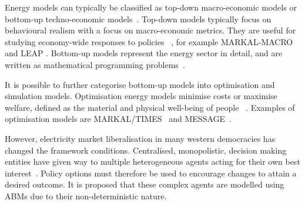 
Energy models can typically be classified as top-down macro-economic models or bottom-up techno-economic models~\cite{Bohringer1998}. Top-down models typically focus on behavioural realism with a focus on macro-economic metrics. They are useful for studying economy-wide responses to policies ~\cite{Hall2016}, for example MARKAL-MACRO \cite{Fishbone1981} and LEAP \cite{Heaps2016}. Bottom-up models represent the energy sector in detail, and are written as mathematical programming problems~\cite{Gargiulo2013}. 

It is possible to further categorise bottom-up models into optimisation and simulation models. Optimisation energy models minimise costs or maximise welfare, defined as the material and physical well-being of people ~\cite{Keles2017}. Examples of optimisation models are MARKAL/TIMES~\cite{Fishbone1981} and MESSAGE~\cite{Schrattenholzer1981}. %

However, electricity market liberalisation in many western democracies has changed the framework conditions. Centralised, monopolistic, decision making entities have given way to multiple heterogeneous agents acting for their own best interest~\cite{Most2010}. Policy options must therefore be used to encourage changes to attain a desired outcome. It is proposed that these complex agents are modelled using ABMs due to their non-deterministic nature. 


